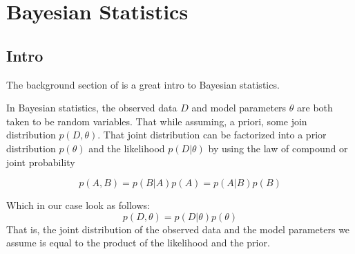 \chapter{Bayesian Statistics}

\section{Intro}

The background section of \cite{maclaurin2016thesis} is a great intro to Bayesian statistics.

In Bayesian statistics, the observed data $D$ and model parameters $\theta$ are both taken to be random
variables.
That while assuming, a priori, some join distribution $p(D, \theta)$.
That joint distribution can be factorized into a prior distribution $p(\theta)$ and the likelihood
$p(D|\theta)$ by using the law of compound or joint probability

$$
p(A, B) = p(B|A) p(A) = p(A|B) p(B)
$$

Which in our case look as follows:
$$
p(D, \theta) = p(D|\theta) p(\theta)
$$
That is, the joint distribution of the observed data and the model parameters we assume is equal to the
product of the likelihood and the prior.